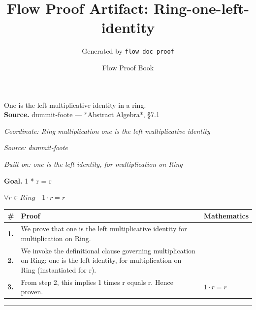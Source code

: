 \documentclass[11pt]{article}
\title{Flow Proof Artifact: Ring-one-left-identity}
\author{Generated by \texttt{flow doc proof}}
\date{Flow Proof Book}
\theoremstyle{definition}
\begin{document}
\maketitle
One is the left multiplicative identity in a ring.\\[0.5em]
\textbf{Source.} dummit-foote — *Abstract Algebra*, §7.1\\[0.5em]
\bigskip
{}\par
\smallskip\noindent\textit{Coordinate: Ring \cdot multiplication \cdot one is the left multiplicative identity}\par
\smallskip\noindent\textit{Source: dummit-foote}\par
\smallskip\noindent\textit{Built on: one is the left identity, for multiplication on Ring}\par
\medskip
\noindent\textbf{Goal.} 1 * r = r\par
\noindent$\displaystyle \forall r \in Ring\quad 1 \cdot r = r$\par
\medskip
\noindent
\begin{tabular}{@{} >{\raggedright\arraybackslash}p{} >{\raggedright\arraybackslash}p{} >{\raggedleft\arraybackslash}p{} @{}}
\textbf{\#} & \textbf{Proof} & \textbf{Mathematics} \\
\midrule
\textbf{1.} & We prove that one is the left multiplicative identity for multiplication on Ring. & \\[0.45em]
\textbf{2.} & We invoke the definitional clause governing multiplication on Ring: one is the left identity, for multiplication on Ring (instantiated for r). & \\[0.45em]
\textbf{3.} & From step 2, this implies 1 times r equals r. Hence proven. & $\displaystyle 1 \cdot r = r$ \\[0.45em]
\bottomrule
\end{tabular}
\label{thm:Ring-multiplication-one_is_the_left_multiplicative_identity}
\par\medskip\hrule
\end{document}
